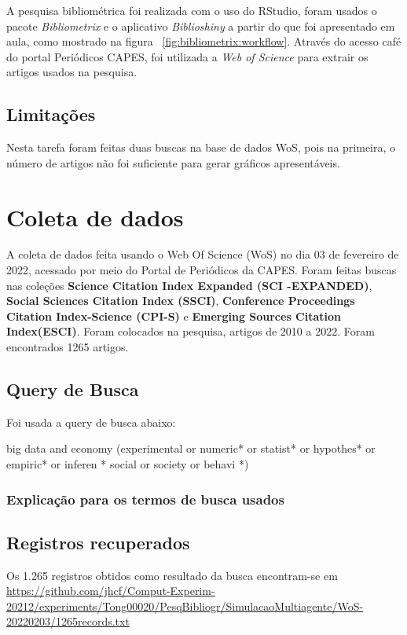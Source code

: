 A pesquisa bibliométrica foi realizada com o uso do RStudio, foram usados o pacote \textit{Bibliometrix} e o aplicativo \textit{Biblioshiny} a partir do que foi apresentado em aula, como mostrado na figura ~\ref{fig:bibliometrix:workflow}. Através do acesso café do portal Periódicos CAPES, foi utilizada a \textit{Web of Science} para extrair os artigos usados na pesquisa.


\subsection{Limitações} 

Nesta tarefa foram feitas duas buscas na base de dados WoS, pois na primeira, o número de artigos não foi suficiente para gerar gráficos apresentáveis.


\section{Coleta de dados}

A coleta de dados feita usando o Web Of Science (WoS) no dia 03 de fevereiro de 2022, acessado por meio do Portal de Periódicos da CAPES. Foram feitas buscas nas coleções \textbf{Science  Citation  Index  Expanded (SCI -EXPANDED)}, \textbf{Social Sciences  Citation  Index (SSCI)}, \textbf{Conference Proceedings Citation Index-Science (CPI-S)} e \textbf{Emerging Sources Citation Index(ESCI)}. Foram colocados na pesquisa, artigos de 2010 a 2022. Foram encontrados 1265 artigos.

\subsection{Query de Busca}

Foi usada a query de busca abaixo: 

big data and economy (experimental  or  numeric* or  statist* or  hypothes* or  empiric* or  inferen * social  or  society  or  behavi *)

\subsubsection{Explicação para os termos de busca usados\label{MASSA:query}}


\subsection{Registros recuperados}

Os 1.265 registros obtidos como resultado da busca encontram-se em \url{https://github.com/jhcf/Comput-Experim-20212/experiments/Tong00020/PesqBibliogr/SimulacaoMultiagente/WoS-20220203/1265records.txt}

